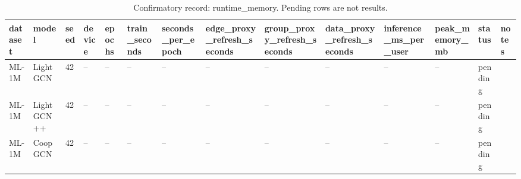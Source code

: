 \begin{table}[t]
\centering
\caption{Confirmatory record: runtime\_memory. Pending rows are not results.}
\begin{tabular}{llllllllllllll}
\toprule
\textbf{dataset} & \textbf{model} & \textbf{seed} & \textbf{device} & \textbf{epochs} & \textbf{train\_seconds} & \textbf{seconds\_per\_epoch} & \textbf{edge\_proxy\_refresh\_seconds} & \textbf{group\_proxy\_refresh\_seconds} & \textbf{data\_proxy\_refresh\_seconds} & \textbf{inference\_ms\_per\_user} & \textbf{peak\_memory\_mb} & \textbf{status} & \textbf{notes} \\
\midrule
ML-1M & LightGCN & 42 & -- & -- & -- & -- & -- & -- & -- & -- & -- & pending &  \\
ML-1M & LightGCN++ & 42 & -- & -- & -- & -- & -- & -- & -- & -- & -- & pending &  \\
ML-1M & CoopGCN & 42 & -- & -- & -- & -- & -- & -- & -- & -- & -- & pending &  \\
\bottomrule
\end{tabular}
\end{table}

